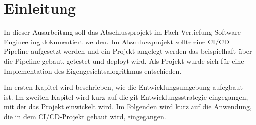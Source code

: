 \chapter{Einleitung}

In dieser Ausarbeitung soll das Abschlussprojekt im Fach \glqq Vertiefung Software Engineering\grqq{} dokumentiert werden. Im Abschlussprojekt sollte eine \ac{CI/CD} Pipeline aufgesetzt werden und ein Projekt angelegt werden das beispielhaft über die Pipeline gebaut, getestet und deployt wird. Als Projekt wurde sich für eine Implementation des Eigengesichtsalogrithmus\cite{TURK1991} entschieden. 

Im ersten Kapitel wird beschrieben, wie die Entwicklungsumgebung aufegbaut ist. Im zweiten Kapitel wird kurz auf die git Entwicklungsstrategie eingegangen, mit der das Projekt einwickelt wird. Im Folgenden wird kurz auf die Anwendung, die in dem \ac{CI/CD}-Projekt gebaut wird, eingegangen.